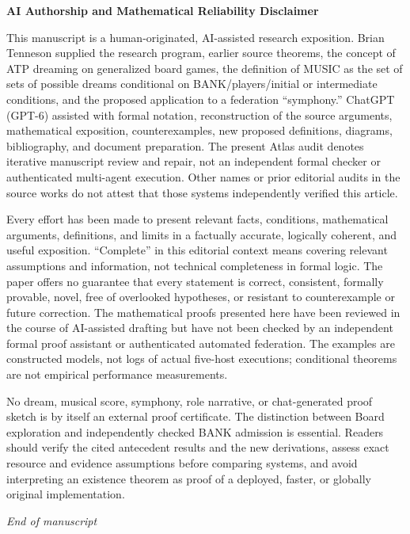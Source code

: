 \documentclass[11pt,letterpaper]{article}
\theoremstyle{definition}
\theoremstyle{remark}
\begin{document}
\clearpage
\thispagestyle{plain}
\vspace*{10mm}
\begin{center}
{\Large\bfseries AI Authorship and Mathematical Reliability Disclaimer}\par
\vspace{3pt}{\small Full statement on the final page}
\end{center}
\vspace{9pt}
This manuscript is a human-originated, AI-assisted research exposition. Brian Tenneson supplied the research program, earlier source theorems, the concept of ATP dreaming on generalized board games, the definition of MUSIC as the set of sets of possible dreams conditional on BANK/players/initial or intermediate conditions, and the proposed application to a federation ``symphony.'' ChatGPT (GPT-6) assisted with formal notation, reconstruction of the source arguments, mathematical exposition, counterexamples, new proposed definitions, diagrams, bibliography, and document preparation. The present Atlas audit denotes iterative manuscript review and repair, not an independent formal checker or authenticated multi-agent execution. Other names or prior editorial audits in the source works do not attest that those systems independently verified this article.

\medskip
Every effort has been made to present relevant facts, conditions, mathematical arguments, definitions, and limits in a factually accurate, logically coherent, and useful exposition. ``Complete'' in this editorial context means covering relevant assumptions and information, not technical completeness in formal logic. The paper offers no guarantee that every statement is correct, consistent, formally provable, novel, free of overlooked hypotheses, or resistant to counterexample or future correction. The mathematical proofs presented here have been reviewed in the course of AI-assisted drafting but have not been checked by an independent formal proof assistant or authenticated automated federation. The examples are constructed models, not logs of actual five-host executions; conditional theorems are not empirical performance measurements.

\medskip
No dream, musical score, symphony, role narrative, or chat-generated proof sketch is by itself an external proof certificate. The distinction between Board exploration and independently checked BANK admission is essential. Readers should verify the cited antecedent results and the new derivations, assess exact resource and evidence assumptions before comparing systems, and avoid interpreting an existence theorem as proof of a deployed, faster, or globally original implementation.

\vfill
\begin{center}\small\itshape End of manuscript\end{center}
\end{document}

